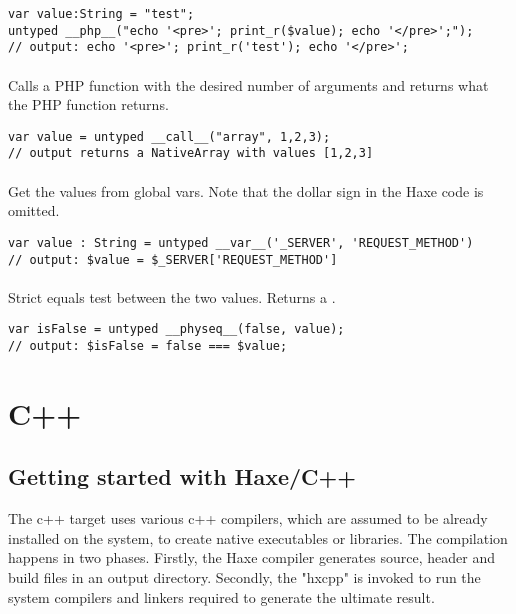\begin{lstlisting}
var value:String = "test";
untyped __php__("echo '<pre>'; print_r($value); echo '</pre>';");
// output: echo '<pre>'; print_r('test'); echo '</pre>';
\end{lstlisting}

\paragraph{}
Calls a PHP function with the desired number of arguments and returns what the PHP function returns.

\begin{lstlisting}
var value = untyped __call__("array", 1,2,3);
// output returns a NativeArray with values [1,2,3]
\end{lstlisting}

\paragraph{}
Get the values from global vars. Note that the dollar sign in the Haxe code is omitted.

\begin{lstlisting}
var value : String = untyped __var__('_SERVER', 'REQUEST_METHOD')
// output: $value = $_SERVER['REQUEST_METHOD']
\end{lstlisting}

\paragraph{}
Strict equals test between the two values. Returns a .

\begin{lstlisting}
var isFalse = untyped __physeq__(false, value);
// output: $isFalse = false === $value;
\end{lstlisting}


\section{C++}
\label{target-cpp}

\subsection{Getting started with Haxe/C++}
\label{target-cpp-getting-started}
The c++ target uses various c++ compilers, which are assumed to be already installed on the system, to create native executables or libraries.  The compilation happens in two phases.  Firstly, the Haxe compiler generates source, header and build files in an output directory.  Secondly, the "hxcpp"  is invoked to run the system compilers and linkers required to generate the ultimate result.

